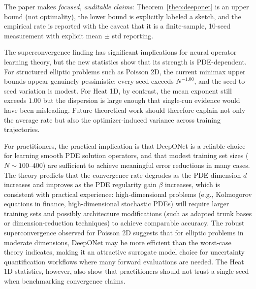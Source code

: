 \documentclass[12pt,a4paper]{article}
\begin{document}
The paper makes \emph{focused, auditable claims}:
Theorem~\ref{theo:deeponet} is an upper bound (not optimality), the lower bound
is explicitly labeled a sketch, and the empirical rate is reported with the
caveat that it is a finite-sample, 10-seed measurement with explicit mean $\pm$
std reporting.

The superconvergence finding has significant implications for neural operator
learning theory, but the new statistics show that its strength is PDE-dependent.
For structured elliptic problems such as Poisson 2D, the current minimax upper
bounds appear genuinely pessimistic: every seed exceeds $N^{-1.00}$, and the
seed-to-seed variation is modest.  For Heat 1D, by contrast, the mean exponent
still exceeds $1.00$ but the dispersion is large enough that single-run evidence
would have been misleading.  Future theoretical work should therefore explain not
only the average rate but also the optimizer-induced variance across training
trajectories.

For practitioners, the practical implication is that DeepONet is a reliable
choice for learning smooth PDE solution operators, and that modest training set
sizes ($N \sim 100$--$400$) are sufficient to achieve meaningful error reductions
in many cases.  The theory predicts that the convergence rate degrades as the
PDE dimension $d$ increases and improves as the PDE regularity gain $\beta$
increases, which is consistent with practical experience: high-dimensional
problems (e.g., Kolmogorov equations in finance, high-dimensional stochastic
PDEs) will require larger training sets and possibly architecture modifications
(such as adapted trunk bases or dimension-reduction techniques) to achieve
comparable accuracy.  The robust superconvergence observed for Poisson 2D suggests
that for elliptic problems in moderate dimensions, DeepONet may be more efficient
than the worst-case theory indicates, making it an attractive surrogate model
choice for uncertainty quantification workflows where many forward evaluations
are needed.  The Heat 1D statistics, however, also show that practitioners should
not trust a single seed when benchmarking convergence claims.
\end{document}
